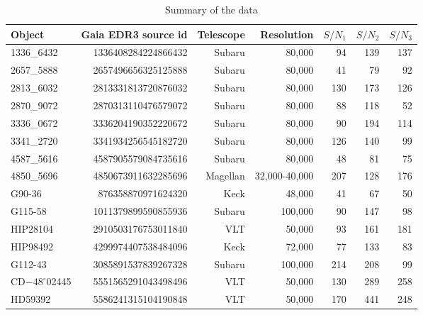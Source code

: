 \documentclass{aa}
\begin{document}
\begin{table}
  \caption{Summary of the data \label{tab:obs}}
  \centering
  \begin{tabular}{lrrrrrr}
\hline\hline
Object & Gaia EDR3 source id & Telescope & Resolution           &  $S/N_1$ & $S/N_2$ &   $S/N_3$   \\\hline
1336\_6432       &  1336408284224866432 & Subaru     &  80,000  &   94     &   139   &   137       \\
2657\_5888       &  2657496656325125888 & Subaru     &  80,000  &   41     &    79   &    92       \\
2813\_6032       &  2813331813720876032 & Subaru     &  80,000  &  130     &   173   &   126       \\
2870\_9072       &  2870313110476579072 & Subaru     &  80,000  &   88     &   118   &    52       \\
3336\_0672       &  3336204190352220672 & Subaru     &  80,000  &   90     &   194   &   114       \\
3341\_2720       &  3341934256545182720 & Subaru     &  80,000  &  126     &   140   &    99       \\
4587\_5616       &  4587905579084735616 & Subaru     &  80,000  &   48     &    81   &    75       \\
4850\_5696 &  4850673911632285696 & Magellan   &  32,000-40,000 &  207     &   128   &   176       \\\hline
G90-36          &   876358870971624320 & Keck       &  48,000   &   41     &    67   &    50       \\
G115-58         &  1011379899590855936 & Subaru     & 100,000   &   90     &   147   &    98       \\
HIP28104        &  2910503176753011840 & VLT        &  50,000   &   93     &   161   &   181       \\
HIP98492        &  4299974407538484096 & Keck       &  72,000   &   77     &   133   &    83       \\\hline
G112-43         &  3085891537839267328 & Subaru     & 100,000   &  214     &   208   &    99       \\
CD$-48^{\circ}$02445      &  5551565291043498496 & VLT        &  50,000   &  130     &   289   &   258       \\
HD59392         &  5586241315104190848 & VLT        &  50,000   &  170     &   441   &   248       \\
\hline
    
  \end{tabular}
 \end{table} 
\end{document}
